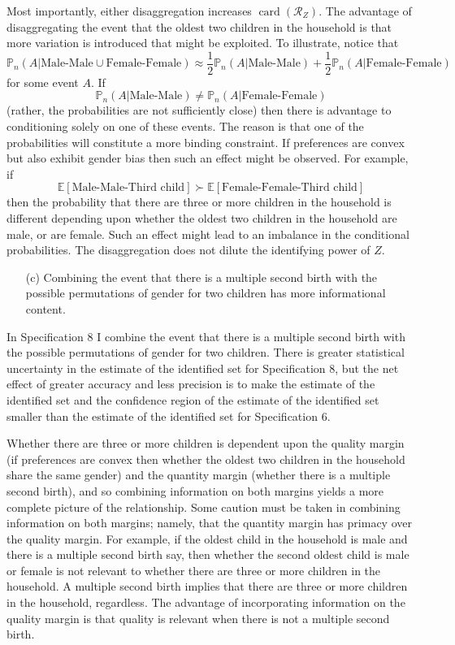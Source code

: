 \documentclass[12pt,a4paper,twoside]{article}
\DeclareMathOperator*{\card}{card}
\numberwithin{equation}{section}
\begin{document}
Most importantly, either disaggregation increases $\card (\mathcal{R}_Z)$. The advantage of disaggregating the event that the oldest two children in the household is that more variation is introduced that might be exploited. To illustrate, notice that
\[\mathbb{P}_n(A|\text{Male-Male}\cup\text{Female-Female})\approx\frac{1}{2}\mathbb{P}_n(A|\text{Male-Male})+\frac{1}{2}\mathbb{P}_n(A|\text{Female-Female})\]
for some event $A$. If 
\[\mathbb{P}_n(A|\text{Male-Male})\neq\mathbb{P}_n(A|\text{Female-Female})\]
(rather, the probabilities are not sufficiently close) then there is advantage to conditioning solely on one of these events. The reason is that one of the probabilities will constitute a more binding constraint. If preferences are convex but also exhibit gender bias then such an effect might be observed. For example, if 
\[\mathbb{E}[\text{Male-Male-Third child}]\succ\mathbb{E}[\text{Female-Female-Third child}]\]
then the probability that there are three or more children in the household is different depending upon whether the oldest two children in the household are male, or are female. Such an effect might lead to an imbalance in the conditional probabilities. The disaggregation does not dilute the identifying power of $Z$.   
\begin{enumerate}
\item[(c)] Combining the event that there is a multiple second birth with the possible permutations of gender for two children has more informational content. 
\end{enumerate}
In Specification 8 I combine the event that there is a multiple second birth with the possible permutations of gender for two children. There is greater statistical uncertainty in the estimate of the identified set for Specification 8, but the net effect of greater accuracy and less precision is to make the estimate of the identified set and the confidence region of the estimate of the identified set smaller than the estimate of the identified set for Specification 6. 

Whether there are three or more children is dependent upon the quality margin (if preferences are convex then whether the oldest two children in the household share the same gender) and the quantity margin (whether there is a multiple second birth), and so combining information on both margins yields a more complete picture of the relationship. Some caution must be taken in combining information on both margins; namely, that the quantity margin has primacy over the quality margin. For example, if the oldest child in the household is male and there is a multiple second birth say, then whether the second oldest child is male or female is not relevant to whether there are three or more children in the household. A multiple second birth implies that there are three or more children in the household, regardless. The advantage of incorporating information on the quality margin is that quality is relevant when there is not a multiple second birth. 
\end{document}
